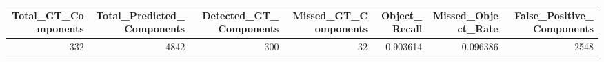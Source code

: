 \begin{tabular}{rrrrrrr}
\toprule
Total_GT_Components & Total_Predicted_Components & Detected_GT_Components & Missed_GT_Components & Object_Recall & Missed_Object_Rate & False_Positive_Components \\
\midrule
332 & 4842 & 300 & 32 & 0.903614 & 0.096386 & 2548 \\
\bottomrule
\end{tabular}
